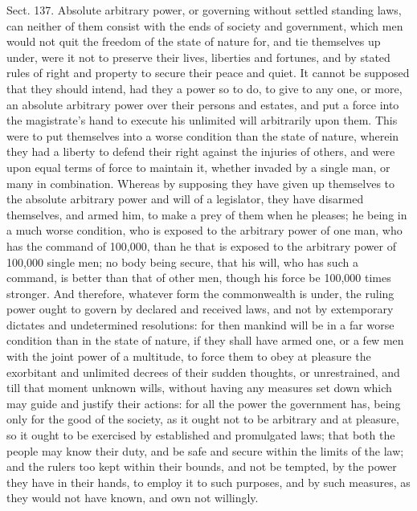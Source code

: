 \documentclass[11pt,openany]{book}
\begin{document}
Sect. 137. Absolute arbitrary power, or governing without settled standing laws, can neither of them consist with the ends of society and government, which men would not quit the freedom of the state of nature for, and tie themselves up under, were it not to preserve their lives, liberties and fortunes, and by stated rules of right and property to secure their peace and quiet. It cannot be supposed that they should intend, had they a power so to do, to give to any one, or more, an absolute arbitrary power over their persons and estates, and put a force into the magistrate's hand to execute his unlimited will arbitrarily upon them. This were to put themselves into a worse condition than the state of nature, wherein they had a liberty to defend their right against the injuries of others, and were upon equal terms of force to maintain it, whether invaded by a single man, or many in combination. Whereas by supposing they have given up themselves to the absolute arbitrary power and will of a legislator, they have disarmed themselves, and armed him, to make a prey of them when he pleases; he being in a much worse condition, who is exposed to the arbitrary power of one man, who has the command of 100,000, than he that is exposed to the arbitrary power of 100,000 single men; no body being secure, that his will, who has such a command, is better than that of other men, though his force be 100,000 times stronger. And therefore, whatever form the commonwealth is under, the ruling power ought to govern by declared and received laws, and not by extemporary dictates and undetermined resolutions: for then mankind will be in a far worse condition than in the state of nature, if they shall have armed one, or a few men with the joint power of a multitude, to force them to obey at pleasure the exorbitant and unlimited decrees of their sudden thoughts, or unrestrained, and till that moment unknown wills, without having any measures set down which may guide and justify their actions: for all the power the government has, being only for the good of the society, as it ought not to be arbitrary and at pleasure, so it ought to be exercised by established and promulgated laws; that both the people may know their duty, and be safe and secure within the limits of the law; and the rulers too kept within their bounds, and not be tempted, by the power they have in their hands, to employ it to such purposes, and by such measures, as they would not have known, and own not willingly.
\end{document}
